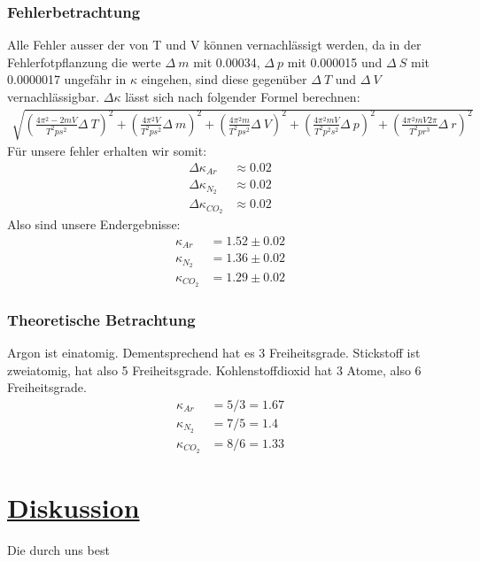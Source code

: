 \documentclass[11pt,a4paper]{article}
\begin{document}
 \subsubsection{Fehlerbetrachtung}
 Alle Fehler ausser der von T und V k\"onnen vernachl\"assigt werden,
 da in der Fehlerfotpflanzung die werte $\Delta~m$ mit 0.00034, $\Delta~p$ mit 0.000015
 und $\Delta~S$ mit 0.0000017 ungef\"ahr in $\kappa$ eingehen, sind diese gegen\"uber
 $\Delta~T$ und $\Delta~V$ vernachl\"assigbar.
 $\Delta\kappa$ l\"asst sich nach folgender Formel berechnen:
 \begin{align*}
    \sqrt{{\left(
              \frac{4{\pi}^{2}-2mV}{{T}^{2}p{s}^{2}}\Delta~T
            \right)}^{2}+
            {\left(
              \frac{4{\pi}^{2}V}{{T}^{2}p{s}^{2}}\Delta~m
            \right)}^{2}+
            {\left(
              \frac{4{\pi}^{2}m}{{T}^{2}p{s}^{2}}\Delta~V
            \right)}^{2}+
            {\left(
              \frac{4{\pi}^{2}mV}{{T}^{2}{p}^{2}{s}^{2}}\Delta~p
            \right)}^{2}+
            {\left(
              \frac{4{\pi}^{2}mV2\pi}{{T}^{2}p{r}^{3}}\Delta~r
            \right)}^{2}
        }
 \end{align*}
 F\"ur unsere fehler erhalten wir somit:
 \begin{align*}
     \Delta{\kappa}_{Ar} &\approx 0.02 \\
     \Delta{\kappa}_{{N}_{2}} &\approx 0.02 \\ 
     \Delta{\kappa}_{{CO}_{2}} &\approx 0.02
 \end{align*}
 Also sind unsere Endergebnisse:
 \begin{align*}
     {\kappa}_{Ar} &= 1.52 \pm 0.02 \\
     {\kappa}_{{N}_{2}} &= 1.36 \pm 0.02 \\
     {\kappa}_{{CO}_{2}} &= 1.29 \pm 0.02
 \end{align*}
 \subsubsection{Theoretische Betrachtung}
Argon ist einatomig. Dementsprechend hat es 3 Freiheitsgrade. Stickstoff ist zweiatomig, hat also 5 Freiheitsgrade. Kohlenstoffdioxid hat 3 Atome, also 6 Freiheitsgrade.
\begin{align*}
  \kappa_{Ar} &= 5/3 = 1.67 \\
  \kappa_{N_{2}} &= 7/5 = 1.4 \\
  \kappa_{CO_{2}} &= 8/6 =1.33
\end{align*}
\newpage
 \section{\underline{Diskussion}}
 Die durch uns best
\end{document}
